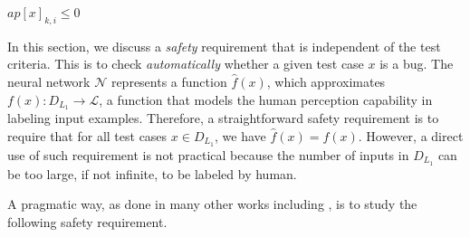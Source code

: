 \documentclass[runningheads,a4paper]{llncs}
\newcommand{\labels}{\mathcal{L}}
\newcommand{\networks}{\mathcal{N}}
\begin{document}
$ap[x]_{k,i}\leq 0$%

In this section, we discuss a \emph{safety} requirement that is independent of the test criteria. This is to check \emph{automatically} whether a given test case $x$ is a bug. 
The neural network  $\networks$ represents a function $\hat{f}(x)$, which approximates $f(x): D_{L_1} \to \labels$, a function that models the human perception capability in labeling input examples.
Therefore, a straightforward safety requirement is to require that for all test cases $x\in D_{L_1}$, we have $\hat{f}(x) = f(x)$. However, a direct use of such  requirement is not practical because the number of inputs in $D_{L_1}$  can be too large, if not infinite, to be labeled by human. 

A pragmatic way, as done in many other works including \cite{SZSBEGF2014,HKWW2017}, is to study the following safety requirement. 
\end{document}
